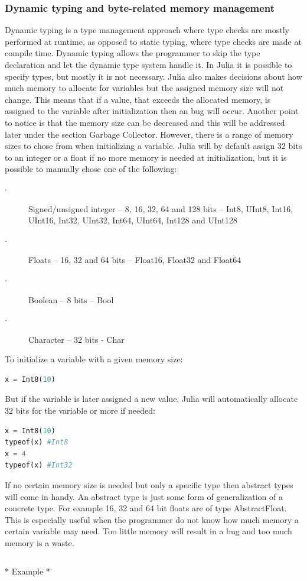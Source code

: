 \documentclass[a4paper, 11pt, titlepage]{article}
\begin{document}
\subsubsection{Dynamic typing and byte-related memory management}
Dynamic typing is a type management approach where type checks are mostly performed at runtime, as opposed to static typing, where type checks are made at compile time. Dynamic typing allows the programmer to skip the type declaration and let the dynamic type system handle it. In Julia it is possible to specify types, but mostly it is not necessary. 
Julia also makes decisions about how much memory to allocate for variables but the assigned memory size will not change. This means that if a value, that exceeds the allocated memory, is assigned to the variable after initialization then an bug will occur. Another point to notice is that the memory size can be decreased and this will be addressed later under the section Garbage Collector. However, there is a range of memory sizes to chose from when initializing a variable. Julia will by default assign 32 bits to an integer or a float if no more memory is needed at initialization, but it is possible to manually chose one of the following:
\begin{description}
	\item[$\cdot$] Signed/unsigned integer – 8, 16, 32, 64 and 128 bits – Int8, UInt8, Int16, UInt16, Int32, UInt32, Int64, UInt64, Int128 and UInt128
	\item[$\cdot$] Floats – 16, 32 and 64 bits – Float16, Float32 and Float64
	\item[$\cdot$] Boolean – 8 bits – Bool
	\item[$\cdot$] Character – 32 bits - Char
\end{description}
To initialize a variable with a given memory size:
\begin{lstlisting}[language=python]
x = Int8(10)
\end{lstlisting}
But if the variable is later assigned a new value, Julia will automatically allocate 32 bits for the variable or more if needed:
\begin{lstlisting}[language=python]
x = Int8(10)
typeof(x) #Int8
x = 4
typeof(x) #Int32
\end{lstlisting}
If no certain memory size is needed but only a specific type then abstract types will come in handy. An abstract type is just some form of generalization of a concrete type. For example 16, 32 and 64 bit floats are of type AbstractFloat. This is especially useful when the programmer do not know how much memory a certain variable may need. Too little memory will result in a bug and too much memory is a waste. 
\begin{lstlisting}
\end{lstlisting}
* Example *
\end{document}
